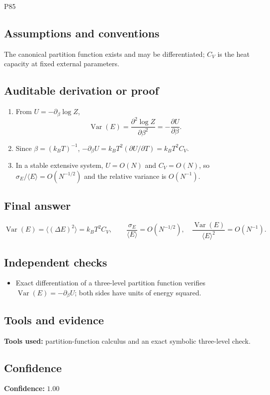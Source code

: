 \documentclass[11pt]{article}
\begin{document}
\begin{mprsolution}{P85}
\subsection*{Assumptions and conventions}
The canonical partition function exists and may be differentiated; \(C_V\) is
the heat capacity at fixed external parameters.
\subsection*{Auditable derivation or proof}
\begin{enumerate}[label=\textbf{Step \arabic*:},leftmargin=*]
\item From \(U=-\partial_\beta\log Z\),
\[
\operatorname{Var}(E)=\frac{\partial^2\log Z}{\partial\beta^2}
=-\frac{\partial U}{\partial\beta}.
\]
\item Since \(\beta=(k_BT)^{-1}\),
\(-\partial_\beta U=k_BT^2(\partial U/\partial T)=k_BT^2C_V\).
\item In a stable extensive system, \(U=O(N)\) and \(C_V=O(N)\), so
\(\sigma_E/\langle E\rangle=O(N^{-1/2})\) and the relative variance is
\(O(N^{-1})\).
\end{enumerate}
\subsection*{Final answer}
\[
\boxed{\displaystyle
\operatorname{Var}(E)=\langle(\Delta E)^2\rangle=k_BT^2C_V,\qquad
\frac{\sigma_E}{\langle E\rangle}=O(N^{-1/2}),\quad
\frac{\operatorname{Var}(E)}{\langle E\rangle^2}=O(N^{-1}).}
\]
\subsection*{Independent checks}
\begin{itemize}[leftmargin=*]
\item Exact differentiation of a three-level partition function verifies
\(\operatorname{Var}(E)=-\partial_\beta U\); both sides have units of energy
squared.
\end{itemize}
\subsection*{Tools and evidence}
\textbf{Tools used:} partition-function calculus and an exact symbolic
three-level check.
\subsection*{Confidence}
\textbf{Confidence:} \(1.00\)
\end{mprsolution}
\end{document}
